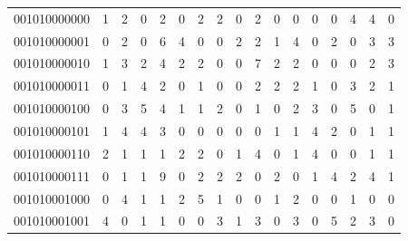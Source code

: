 \documentclass[10pt,a4paper]{article}
\begin{document}
\begin{longtable}{ |c|c|c|c|c|c|c|c|c|c|c|c|c|c|c|c|c| }
    001010000000              & 1                            & 2                                & 0                            & 2                              & 0   & 2   & 2   & 0   & 2   & 0   & 0   & 0   & 0   & 4   & 4   & 0   \\
    001010000001              & 0                            & 2                                & 0                            & 6                              & 4   & 0   & 0   & 2   & 2   & 1   & 4   & 0   & 2   & 0   & 3   & 3   \\
    001010000010              & 1                            & 3                                & 2                            & 4                              & 2   & 2   & 0   & 0   & 7   & 2   & 2   & 0   & 0   & 0   & 2   & 3   \\
    001010000011              & 0                            & 1                                & 4                            & 2                              & 0   & 1   & 0   & 0   & 2   & 2   & 2   & 1   & 0   & 3   & 2   & 1   \\
    001010000100              & 0                            & 3                                & 5                            & 4                              & 1   & 1   & 2   & 0   & 1   & 0   & 2   & 3   & 0   & 5   & 0   & 1   \\
    001010000101              & 1                            & 4                                & 4                            & 3                              & 0   & 0   & 0   & 0   & 0   & 1   & 1   & 4   & 2   & 0   & 1   & 1   \\
    001010000110              & 2                            & 1                                & 1                            & 1                              & 2   & 2   & 0   & 1   & 4   & 0   & 1   & 4   & 0   & 0   & 1   & 1   \\
    001010000111              & 0                            & 1                                & 1                            & 9                              & 0   & 2   & 2   & 2   & 0   & 2   & 0   & 1   & 4   & 2   & 4   & 1   \\
    001010001000              & 0                            & 4                                & 1                            & 1                              & 2   & 5   & 1   & 0   & 0   & 1   & 2   & 0   & 0   & 1   & 0   & 0   \\
    001010001001              & 4                            & 0                                & 1                            & 1                              & 0   & 0   & 3   & 1   & 3   & 0   & 3   & 0   & 5   & 2   & 3   & 0   \\

\end{longtable}
\end{document}

